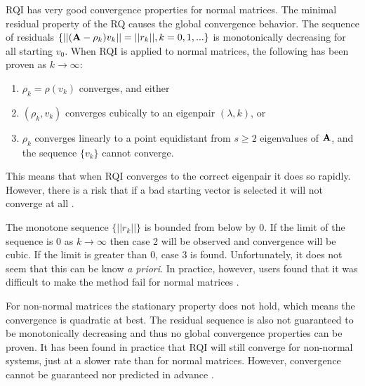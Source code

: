 RQI has very good convergence properties for normal matrices. The minimal residual property of the RQ causes the global convergence behavior. The sequence of residuals $\{ ||(\mathbf{A} - \rho_{k})v_{k}|| = ||r_{k}||, k = 0, 1, ... \}$ is monotonically decreasing for all starting $v_{0}$. When RQI is applied to normal matrices, the following has been proven as $k \to \infty$:
%
\begin{enumerate}
 \item $\rho_{k} = \rho(v_{k})$ converges, and either
 \item $(\rho_{k}, v_{k})$ converges cubically to an eigenpair $(\lambda, k)$, or
 \item $\rho_{k}$ converges linearly to a point equidistant from $s \ge 2$ eigenvalues of $\mathbf{A}$, and the sequence $\{v_{k}\}$ cannot converge. 
\end{enumerate}
%
This means that when RQI converges to the correct eigenpair it does so rapidly. However, there is a risk that if a bad starting vector is selected it will not converge at all \cite{Parlett1974}. 

The monotone sequence $\{||r_{k}||\}$ is bounded from below by 0. If the limit of the sequence is 0 as $k \to \infty$ then case 2 will be observed and convergence will be cubic. If the limit is greater than 0, case 3 is found. Unfortunately, it does not seem that this can be know \emph{a priori}. In practice, however, users found that it was difficult to make the method fail for normal matrices \cite{Parlett1974}. 

For non-normal matrices the stationary property does not hold, which means the convergence is quadratic at best. The residual sequence is also not guaranteed to be monotonically decreasing and thus no global convergence properties can be proven. It has been found in practice that RQI will still converge for non-normal systems, just at a slower rate than for normal matrices. However, convergence cannot be guaranteed nor predicted in advance \cite{Parlett1974}. 


